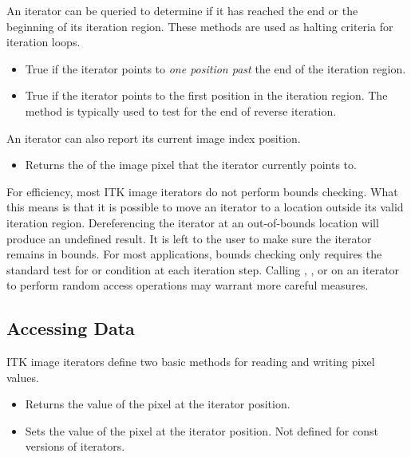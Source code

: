 An iterator can be queried to determine if it has reached the end or the
beginning of its iteration region.  These methods are used as halting criteria
for iteration loops.

\begin{itemize}
\item \textbf{} True if the iterator points to \emph{one
position past} the end of the iteration region.

\item \textbf{} True if the iterator points to the first
position in the iteration region.  The method is typically used to test for the
end of reverse iteration.

\end{itemize}

An iterator can also report its current image index position.

\begin{itemize}
\item \textbf{} Returns the 
of the image pixel that the iterator currently points to.
\end{itemize}

For efficiency, most ITK image iterators do not perform bounds checking.  What
this means is that it is possible to move an iterator to a location outside its
valid iteration region.  Dereferencing the iterator at an out-of-bounds location
will produce an undefined result. It is left to the user to make sure the
iterator remains in bounds.  For most applications,  bounds checking only
requires the standard test for  or  condition at each
iteration step.  Calling ,  , or
 on an iterator to perform random access operations may
warrant more careful measures. 

\subsection{Accessing Data}
\label{sec:AccessingData}
ITK image iterators define two basic methods for reading and writing pixel
values.

\begin{itemize}
\item \textbf{} Returns the value of the pixel at the
iterator position.

\item \textbf{} Sets the value of the pixel at the
iterator position.  Not defined for const versions of iterators.
\end{itemize}

